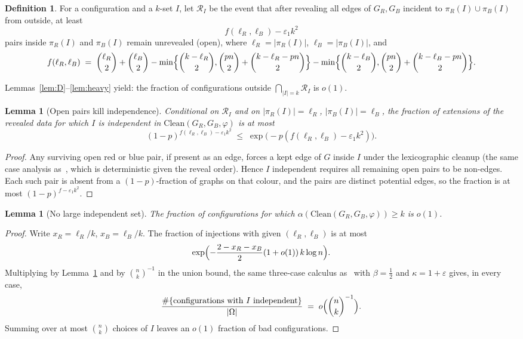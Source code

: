 \documentclass[11pt]{article}
\newtheorem{lemma}[theorem]{Lemma}
\theoremstyle{definition}
\newtheorem{definition}[theorem]{Definition}
\newcommand{\bin}[2]{\binom{#1}{#2}}
\newcommand{\cR}{\mathcal{R}}
\newcommand{\eps}{\varepsilon}
\begin{document}
\begin{definition}
For a configuration and a $k$-set $I$, let $\cR_{I}$ be the event that after revealing all edges of $G_{R},G_{B}$ incident to $\pi_{R}(I)\cup\pi_{B}(I)$ from outside, at least
\[
  f(\ell_{R},\ell_{B})-\eps_{1}k^{2}
\]
pairs inside $\pi_{R}(I)$ and $\pi_{B}(I)$ remain unrevealed (open), where $\ell_{R}=|\pi_{R}(I)|$, $\ell_{B}=|\pi_{B}(I)|$, and
\[
  f(\ell_{R},\ell_{B})
  \;=\;
  \bin{\ell_{R}}{2}+\bin{\ell_{B}}{2}
  -\min\Bigl\{\bin{k-\ell_{R}}{2},\bin{pn}{2}+\bin{k-\ell_{R}-pn}{2}\Bigr\}
  -\min\Bigl\{\bin{k-\ell_{B}}{2},\bin{pn}{2}+\bin{k-\ell_{B}-pn}{2}\Bigr\}.
\]
\end{definition}

Lemmas~\ref{lem:D}--\ref{lem:heavy} yield: the fraction of configurations outside $\bigcap_{|I|=k}\cR_{I}$ is $o(1)$.

\begin{lemma}[Open pairs kill independence]\label{lem:kill}
Conditional on $\cR_{I}$ and on $|\pi_{R}(I)|=\ell_{R}$, $|\pi_{B}(I)|=\ell_{B}$, the fraction of extensions of the revealed data for which $I$ is independent in $\mathrm{Clean}(G_{R},G_{B},\varphi)$ is at most
\[
  (1-p)^{f(\ell_{R},\ell_{B})-\eps_{1}k^{2}}
  \;\le\;
  \exp\bigl(-p(f(\ell_{R},\ell_{B})-\eps_{1}k^{2})\bigr).
\]
\end{lemma}

\begin{proof}
Any surviving open red or blue pair, if present as an edge, forces a kept edge of $G$ inside $I$ under the lexicographic cleanup (the same case analysis as~\cite[Lemma~4.1]{HHKP2025}, which is deterministic given the reveal order).
Hence $I$ independent requires all remaining open pairs to be non-edges.
Each such pair is absent from a $(1-p)$-fraction of graphs on that colour, and the pairs are distinct potential edges, so the fraction is at most $(1-p)^{f-\eps_{1}k^{2}}$.
\end{proof}

\begin{lemma}[No large independent set]\label{lem:alpha}
The fraction of configurations for which $\alpha(\mathrm{Clean}(G_{R},G_{B},\varphi))\ge k$ is $o(1)$.
\end{lemma}

\begin{proof}
Write $x_{R}=\ell_{R}/k$, $x_{B}=\ell_{B}/k$.
The fraction of injections with given $(\ell_{R},\ell_{B})$ is at most
\[
  \exp\Bigl(-\frac{2-x_{R}-x_{B}}{2}(1+o(1))\,k\log n\Bigr).
\]
Multiplying by Lemma~\ref{lem:kill} and by $\bin{n}{k}^{-1}$ in the union bound, the same three-case calculus as~\cite[Lemma~4.2]{HHKP2025} with $\beta=\tfrac12$ and $\kappa=1+\eps$ gives, in every case,
\[
  \frac{\#\{\text{configurations with $I$ independent}\}}{|\Omega|}
  \;=\;
  o\Bigl(\bin{n}{k}^{-1}\Bigr).
\]
Summing over at most $\bin{n}{k}$ choices of $I$ leaves an $o(1)$ fraction of bad configurations.
\end{proof}
\end{document}
